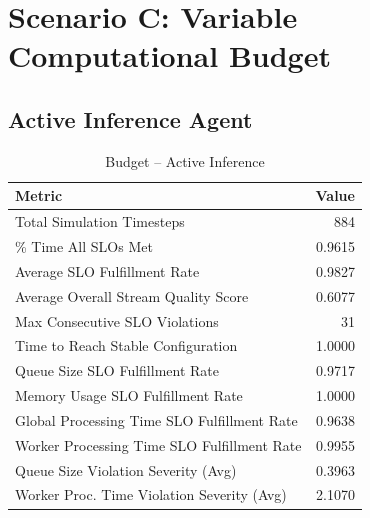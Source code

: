 \clearpage
\section{Scenario C: Variable Computational Budget}

\subsection*{Active Inference Agent}
\begin{table}[h]
\centering
\caption{Budget – Active Inference}
\label{tab:budget_active_inference}
\begin{tabular}{lr}
\toprule
Metric & Value \\
\midrule
Total Simulation Timesteps & 884 \\
\% Time All SLOs Met & 0.9615 \\
Average SLO Fulfillment Rate & 0.9827 \\
Average Overall Stream Quality Score & 0.6077 \\
Max Consecutive SLO Violations & 31 \\
Time to Reach Stable Configuration & 1.0000 \\
Queue Size SLO Fulfillment Rate & 0.9717 \\
Memory Usage SLO Fulfillment Rate & 1.0000 \\
Global Processing Time SLO Fulfillment Rate & 0.9638 \\
Worker Processing Time SLO Fulfillment Rate & 0.9955 \\
Queue Size Violation Severity (Avg) & 0.3963 \\
Worker Proc. Time Violation Severity (Avg) & 2.1070 \\
\bottomrule
\end{tabular}
\end{table}


